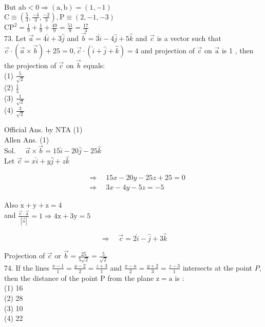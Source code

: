 \documentclass[10pt]{article}
\begin{document}
But \(\mathrm{ab}<0 \Rightarrow(\mathrm{a}, \mathrm{b})=(1,-1)\)\\
\(\mathrm{C} \equiv\left(\frac{5}{3}, \frac{-4}{3}, \frac{-2}{3}\right), \mathrm{P} \equiv(2,-1,-3)\)\\
\(\mathrm{CP}^{2}=\frac{1}{9}+\frac{1}{9}+\frac{49}{9}=\frac{51}{9}=\frac{17}{3}\)\\
73. Let \(\vec{a}=4 \hat{i}+3 \hat{j}\) and \(\vec{b}=3 \hat{i}-4 \hat{j}+5 \hat{k}\) and \(\vec{c}\) is a vector such that \(\vec{c} \cdot(\vec{a} \times \vec{b})+25=0, \vec{c} \cdot(\hat{i}+\hat{j}+\hat{k})=4\) and projection of \(\overrightarrow{\mathrm{c}}\) on \(\overrightarrow{\mathrm{a}}\) is 1 , then the projection of \(\vec{c}\) on \(\vec{b}\) equals:\\
(1) \(\frac{5}{\sqrt{2}}\)\\
(2) \(\frac{1}{5}\)\\
(3) \(\frac{1}{\sqrt{2}}\)\\
(4) \(\frac{3}{\sqrt{2}}\)

Official Ans. by NTA (1)\\
Allen Ans. (1)\\
Sol. \(\quad \vec{a} \times \vec{b}=15 \hat{i}-20 \hat{j}-25 \hat{k}\)\\
Let \(\vec{c}=x \hat{i}+y \hat{j}+z \hat{k}\)

\[
\begin{aligned}
& \Rightarrow \quad 15 x-20 y-25 z+25=0 \\
& \Rightarrow \quad 3 x-4 y-5 z=-5
\end{aligned}
\]

Also \(\mathrm{x}+\mathrm{y}+\mathrm{z}=4\)\\
and \(\frac{\overrightarrow{\mathrm{c}} \cdot \overrightarrow{\mathrm{a}}}{|\overrightarrow{\mathrm{a}}|}=1 \Rightarrow 4 \mathrm{x}+3 \mathrm{y}=5\)

\[
\Rightarrow \quad \vec{c}=2 \hat{i}-\hat{j}+3 \hat{k}
\]

Projection of \(\vec{c}\) or \(\vec{b}=\frac{25}{5 \sqrt{2}}=\frac{5}{\sqrt{2}}\)\\
74. If the lines \(\frac{x-1}{1}=\frac{y-2}{2}=\frac{z+3}{1}\) and \(\frac{x-a}{2}=\frac{y+2}{3}=\frac{z-3}{1}\) intersects at the point \(P\), then the distance of the point P from the plane \(\mathrm{z}=\mathrm{a}\) is :\\
(1) 16\\
(2) 28\\
(3) 10\\
(4) 22
\end{document}
